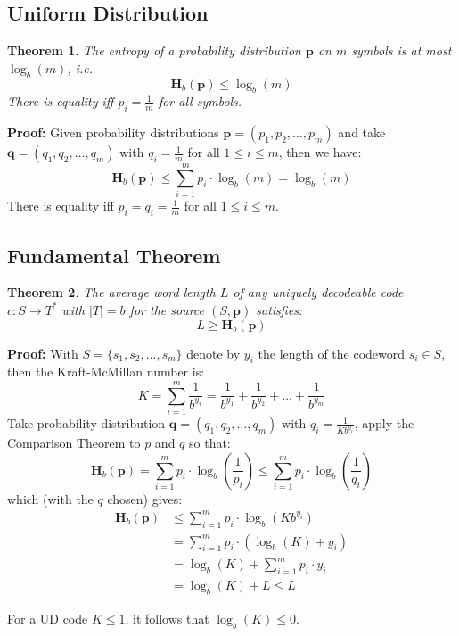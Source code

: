 \documentclass[11pt]{article}
\newtheorem{theo}{Theorem}
\begin{document}
\subsection{Uniform Distribution}
\begin{theo}
  The entropy of a probability distribution $\textbf{p}$ on $m$ symbols is at most $\log_b(m)$, i.e.
  \[
    \textbf{H}_b(\textbf{p}) \leq \log_b(m)
  \]
  There is equality iff $p_i = \frac{1}{m}$ for all symbols.
\end{theo}

\textbf{Proof:}
Given probability distributions $\textbf{p} = (p_1, p_2, \ldots, p_m)$ and take $\textbf{q} = (q_1, q_2, \ldots, q_m)$ with $q_i = \frac{1}{m}$ for all $1 \leq i \leq m$, then we have:
\[
  \textbf{H}_b(\textbf{p}) \leq \sum_{i = 1}^m p_i \cdot \log_b(m) = \log_b(m)
\]
There is equality iff $p_i = q_i = \frac{1}{m}$ for all $1 \leq i \leq m$.

\subsection{Fundamental Theorem}
\begin{theo}
  The average word length $L$ of any uniquely decodeable code $c : S \rightarrow T^*$ with $\lvert T \rvert = b$ for the source $(S, \textbf{p})$ satisfies:
  \[
    L \geq \textbf{H}_b(\textbf{p})
  \]
\end{theo}

\textbf{Proof:}
With $S = \{ s_1, s_2, \ldots, s_m \}$ denote by $y_i$ the length of the codeword $s_i \in S$, then the Kraft-McMillan number is:
\[
  K =\sum_{i = 1}^m \frac{1}{b^{y_i}} = \frac{1}{b^{y_1}} + \frac{1}{b^{y_2}} + \ldots + \frac{1}{b^{y_m}}
\]
Take probability distribution $\textbf{q} = (q_1, q_2, \ldots, q_m)$ with $q_i = \frac{1}{Kb^{y_i}}$, apply the Comparison Theorem to $p$ and $q$ so that:
\[
  \textbf{H}_b(\textbf{p}) = \sum_{i = 1}^m p_i \cdot \log_b(\frac{1}{p_i}) \leq \sum_{i = 1}^m p_i \cdot \log_b(\frac{1}{q_i})
\]
which (with the $q$ chosen) gives:
\begin{align*}
  \textbf{H}_b(\textbf{p}) & \leq \sum_{i = 1}^m p_i \cdot \log_b(Kb^{y_i}) \\
  & = \sum_{i = 1}^m p_i \cdot (\log_b(K) + y_i) \\
  & = \log_b(K) + \sum_{i = 1}^m p_i \cdot y_i \\
  & = \log_b(K) + L \leq L
\end{align*}

For a UD code $K \leq 1$, it follows that $\log_b(K) \leq 0$.
\end{document}
